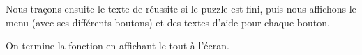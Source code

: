 \documentclass[]{article}
\begin{document}
Nous traçons ensuite le texte de réussite si le puzzle est fini, puis nous affichons le menu (avec ses différents boutons) et des textes d'aide pour chaque bouton.

On termine la fonction en affichant le tout à l'écran. 


\newpage
\end{document}
